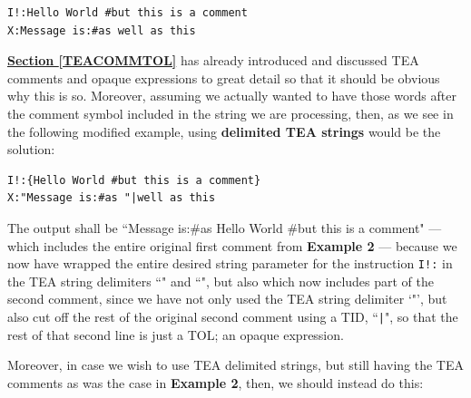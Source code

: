 \documentclass[a4paper, 18pt]{book} %
\begin{document}
{{{\begin{appendices}
\vspace{2em}

  \begin{tcolorbox}[teaterminalstyle, title=TEA STRINGS: Example 2: Strings without Delimiters, breakable]
  \begin{lstlisting}[language=TEA,breaklines=true,]
I!:Hello World #but this is a comment
X:Message is:#as well as this
   \end{lstlisting}
  \end{tcolorbox}

\vspace{2em}


\textbf{\hyperref[TEACOMMTOL]{Section \ref{TEACOMMTOL}}} has already introduced and discussed TEA comments and opaque expressions to great detail so that it should be obvious why this is so. Moreover, assuming we actually wanted to have those words after the comment symbol included in the string we are processing, then, as we see in the following modified example, using \textbf{delimited TEA strings} would be the solution:



\vspace{2em}

  \begin{tcolorbox}[teaterminalstyle, title=TEA STRINGS: Example 3: Strings with Delimiters, breakable]
  \begin{lstlisting}[language=TEA,breaklines=true,]
I!:{Hello World #but this is a comment}
X:"Message is:#as "|well as this
   \end{lstlisting}
  \end{tcolorbox}

\vspace{2em}


The output shall be ``Message is:\#as Hello World \#but this is a comment" --- which includes the entire original first comment from \textbf{Example 2} --- because we now have wrapped the entire desired string parameter for the instruction \texttt{I!:} in the TEA string delimiters ``{" and ``}", but also which now includes part of the second comment, since we have not only used the TEA string delimiter `"', but also cut off the rest of the original second comment using a TID, ``\verb$|$", so that the rest of that second line is just a TOL; an opaque expression.

\vspace{2em}

Moreover, in case we wish to use TEA delimited strings, but still having the TEA comments as was the case in \textbf{Example 2}, then, we should instead do this:




\end{appendices}}}}
\end{document}
